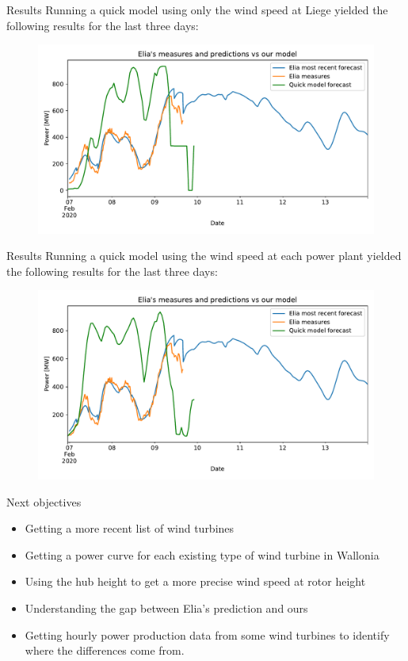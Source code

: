 \documentclass[12pt]{beamer}
\begin{document}
\begin{frame}{Results}
    Running a quick model \alert{using only the wind speed at Liege} yielded the following results for the \alert{last three days}:
    \begin{figure}
        \centering
        \includegraphics[width=\textwidth]{resources/pdf/quick_model_liege.pdf}
    \end{figure}
\end{frame}

\begin{frame}{Results}
    Running a quick model \alert{using the wind speed at each power plant} yielded the following results for the \alert{last three days}:
    \begin{figure}
        \centering
        \includegraphics[width=\textwidth]{resources/pdf/quick_model.pdf}
    \end{figure}
\end{frame}

\begin{frame}{Next objectives}
    \begin{itemize}
        \item Getting a \alert{more recent list of wind turbines}
        \item Getting a \alert{power curve} for each existing type of wind turbine in Wallonia
        \item Using the \alert{hub height} to get a more precise wind speed at rotor height
        \item \alert{Understanding the gap} between Elia's prediction and ours
        \item Getting hourly power production data from some wind turbines to \alert{identify where the differences come from}.
    \end{itemize}
\end{frame}

\begin{frame}[allowframebreaks]
    \printbibliography
\end{frame}
\end{document}
